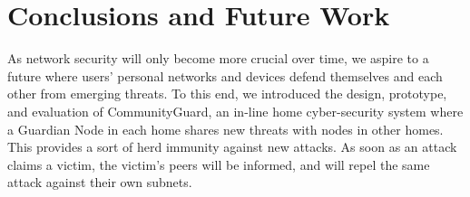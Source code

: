 \section{Conclusions and Future Work}
\label{sec:concl}

As network security will only become more crucial over time, we aspire to a future where users' personal networks and devices defend themselves and each other from emerging threats. To this end, we introduced the design, prototype, and evaluation of CommunityGuard, an in-line home cyber-security system where a Guardian Node in each home shares new threats with nodes in other homes. This provides a sort of herd immunity against new attacks. As soon as an attack claims a victim, the victim's peers will be informed, and will repel the same attack against their own subnets. 


%
%

